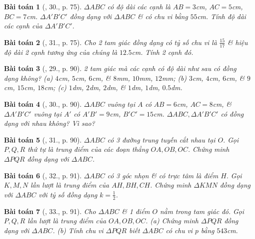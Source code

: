 \documentclass{article}
\newtheorem{baitoan}{Bài toán}
\begin{document}
\begin{baitoan}[\cite{SGK_Toan_8_tap_2}, 30., p. 75]
	$\Delta ABC$ có độ dài các cạnh là $AB = 3$\emph{cm}, $AC = 5$\emph{cm}, $BC = 7$\emph{cm}. $\Delta A'B'C'$ đồng dạng với $\Delta ABC$ \& có chu vi bằng $55$\emph{cm}. Tính độ dài các cạnh của $\Delta A'B'C'$.
\end{baitoan}

\begin{baitoan}[\cite{SGK_Toan_8_tap_2}, 31., p. 75]
	Cho 2 tam giác đồng dạng có tỷ số chu vi là $\frac{15}{17}$ \& hiệu độ dài 2 cạnh tương ứng của chúng là $12.5$\emph{cm}. Tính 2 cạnh đó.
\end{baitoan}

\begin{baitoan}[\cite{SBT_Toan_8_tap_2}, 29., p. 90]
	2 tam giác mà các cạnh có độ dài như sau có đồng dạng không? (a) $4$\emph{cm}, $5$\emph{cm}, $6$\emph{cm}, \& $8$\emph{mm}, $10$\emph{mm}, $12$\emph{mm}; (b) $3$\emph{cm}, $4$\emph{cm}, $6$\emph{cm}, \& $9$\emph{cm}, $15$\emph{cm}, $18$\emph{cm}; (c) $1$\emph{dm}, $2$\emph{dm}, $2$\emph{dm}, \& $1$\emph{dm}, $1$\emph{dm}, $0.5$\emph{dm}.
\end{baitoan}

\begin{baitoan}[\cite{SBT_Toan_8_tap_2}, 30., p. 90]
	$\Delta ABC$ vuông tại $A$ có $AB = 6$\emph{cm}, $AC = 8$\emph{cm}, \& $\Delta A'B'C'$ vuông tại $A'$ có $A'B' = 9$\emph{cm}, $B'C' = 15$\emph{cm}. $\Delta ABC,\Delta A'B'C'$ có đồng dạng với nhau không? Vì sao?
\end{baitoan}

\begin{baitoan}[\cite{SBT_Toan_8_tap_2}, 31., p. 90]
	$\Delta ABC$ có 3 đường trung tuyến cắt nhau tại $O$. Gọi $P,Q,R$ thứ tự là trung điểm của các đoạn thẳng $OA,OB,OC$. Chứng minh $\Delta PQR$ đồng dạng với $\Delta ABC$.
\end{baitoan}

\begin{baitoan}[\cite{SBT_Toan_8_tap_2}, 32., p. 91]
	$\Delta ABC$ có 3 góc nhọn \& có trực tâm là điểm $H$. Gọi $K,M,N$ lần lượt là trung điểm của $AH,BH,CH$. Chứng minh $\Delta KMN$ đồng dạng với $\Delta ABC$ với tỷ số đồng dạng $k = \frac{1}{2}$.
\end{baitoan}

\begin{baitoan}[\cite{SBT_Toan_8_tap_2}, 33., p. 91]
	Cho $\Delta ABC$ \& 1 điểm $O$ nằm trong tam giác đó. Gọi $P,Q,R$ lần lượt là trung điểm của $OA,OB,OC$. (a) Chứng minh $\Delta PQR$ đồng dạng với $\Delta ABC$. (b) Tính chu vi $\Delta PQR$ biết $\Delta ABC$ có chu vi $p$ bằng $543$\emph{cm}.
\end{baitoan}
\end{document}
